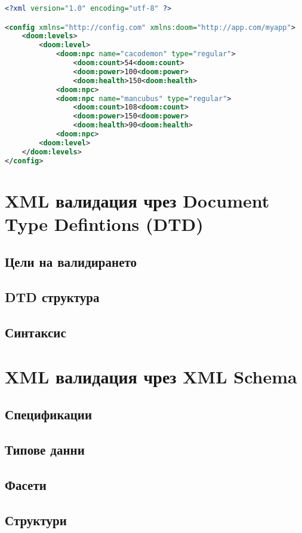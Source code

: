 \documentclass[fleqn,12pt]{article}
\begin{document}
\begin{lstlisting}[language=XML, caption=Doom namespace]
<?xml version="1.0" encoding="utf-8" ?>

<config xmlns="http://config.com" xmlns:doom="http://app.com/myapp">
    <doom:levels>
        <doom:level>
            <doom:npc name="cacodemon" type="regular">
                <doom:count>54<doom:count>
                <doom:power>100<doom:power>
                <doom:health>150<doom:health>
            <doom:npc>
            <doom:npc name="mancubus" type="regular">
                <doom:count>108<doom:count>
                <doom:power>150<doom:power>
                <doom:health>90<doom:health>
            <doom:npc>
        <doom:level>
    </doom:levels>
</config>
\end{lstlisting}


\section{XML валидация чрез Document Type Defintions (DTD)}

\subsection{Цели на валидирането}
\subsection{DTD структура}
\subsection{Синтаксис}

\section{XML валидация чрез XML Schema}

\subsection{Спецификации}
\subsection{Типове данни}
\subsection{Фасети}
\subsection{Структури}
\end{document}
